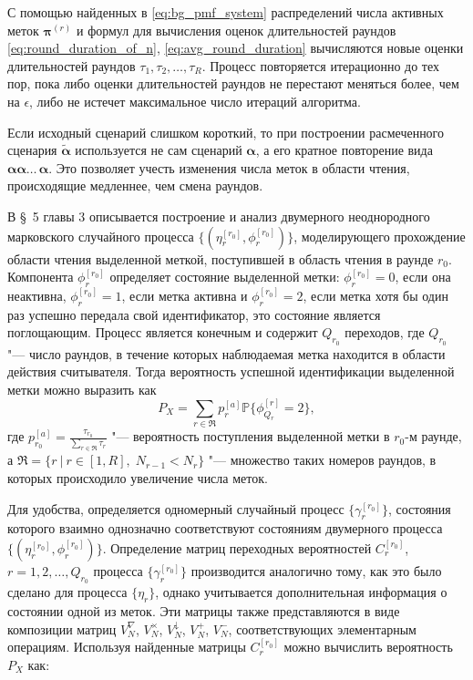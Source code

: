 С помощью найденных в \eqref{eq:bg_pmf_system} распределений числа активных меток $\bm{\pi}^{(r)}$ и формул для вычисления оценок длительностей раундов \eqref{eq:round_duration_of_n}, \eqref{eq:avg_round_duration} вычисляются новые оценки длительностей раундов $\tau_1, \tau_2, \dots, \tau_R$. Процесс повторяется итерационно до тех пор, пока либо оценки длительностей раундов не перестают меняться более, чем на $\epsilon$, либо не истечет максимальное число итераций алгоритма.

Если исходный сценарий слишком короткий, то при построении расмеченного сценария $\widetilde{\bm{\alpha}}$ используется не сам сценарий $\bm{\alpha}$, а его кратное повторение вида $\bm{\alpha} \bm{\alpha} \dots\, \bm{\alpha}$. Это позволяет учесть изменения числа меток в области чтения, происходящие медленнее, чем смена раундов.

В \S~5 главы 3 описывается построение и анализ двумерного неоднородного марковского случайного процесса $\{ (\eta_r^{[r_0]}, \phi_r^{[r_0]}) \}$, моделирующего прохождение области чтения выделенной меткой, поступившей в область чтения в раунде $r_0$. Компонента $\phi_r^{[r_0]}$ определяет состояние выделенной метки: $\phi_r^{[r_0]} = 0$, если она неактивна, $\phi_r^{[r_0]} = 1$, если метка активна и $\phi_r^{[r_0]} = 2$, если метка хотя бы один раз успешно передала свой идентификатор, это состояние является поглощающим. Процесс является конечным и содержит $Q_{r_0}$ переходов, где $Q_{r_0}$ "--- число раундов, в течение которых наблюдаемая метка находится в области действия считывателя. Тогда вероятность успешной идентификации выделенной метки можно выразить как
\begin{equation}\label{eq:id_prob_phi}
  P_X = \sum\limits_{r \in \mathfrak{R}} p^{[a]}_r \mathbb{P}\{ \phi^{[r]}_{Q_r} = 2 \},
\end{equation}
где $p^{[a]}_{r_0} = \frac{\tau_{r_0}}{\sum_{r \in \mathfrak{R}} \tau_r}$ "--- вероятность поступления выделенной метки в $r_0$-м раунде, а $\mathfrak{R} = \{ r\:|\:r \in [1, R],\; N_{r-1} < N_r \}$ "--- множество таких номеров раундов, в которых происходило увеличение числа меток.

Для удобства, определяется одномерный случайный процесс $\{ \gamma_r^{[r_0]} \}$, состояния которого взаимно однозначно соответствуют состояниям двумерного процесса $\{ (\eta_r^{[r_0]}, \phi_r^{[r_0]}) \}$. Определение матриц переходных вероятностей $C_r^{[r_0]}$, $r = 1, 2, \dots, Q_{r_0}$ процесса $\{ \gamma_r^{[r_0]} \}$ производится аналогично тому, как это было сделано для процесса $\{ \eta_r \}$, однако учитывается дополнительная информация о состоянии одной из меток. Эти матрицы также представляются в виде композиции матриц $V^\nabla_N$, $V^\times_N$, $V^\downarrow_N$, $V^+_N$, $V^-_N$, соответствующих элементарным операциям. Используя найденные матрицы $C_r^{[r_0]}$ можно вычислить вероятность $P_X$ как:

